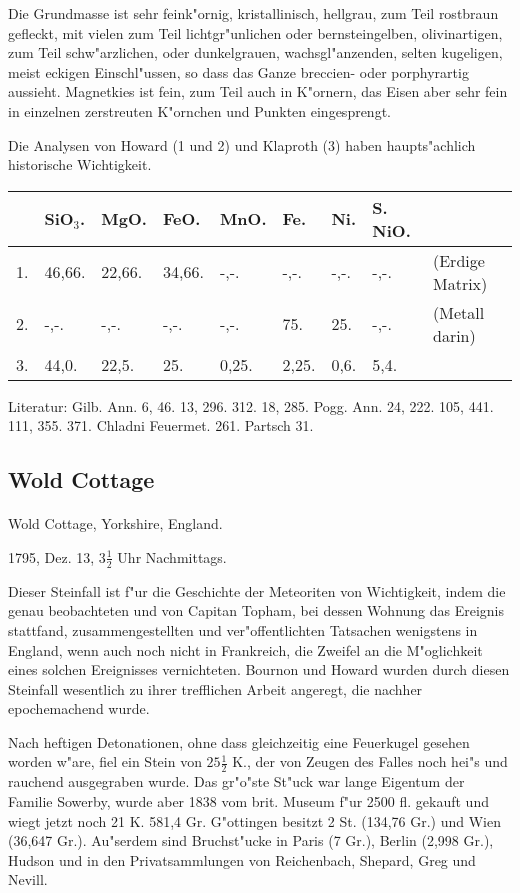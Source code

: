 \documentclass[a4paper, 11pt, oneside]{article}
\begin{document}
Die Grundmasse ist sehr feink"ornig, kristallinisch, hellgrau, zum Teil rostbraun gefleckt, mit vielen zum Teil lichtgr"unlichen oder bernsteingelben, olivinartigen, zum Teil schw"arzlichen, oder dunkelgrauen, wachsgl"anzenden, selten kugeligen, meist eckigen Einschl"ussen, so dass das Ganze breccien- oder porphyrartig aussieht. Magnetkies ist fein, zum Teil auch in K"ornern, das Eisen aber sehr fein in einzelnen zerstreuten K"ornchen und Punkten eingesprengt.

Die Analysen von Howard (1 und 2) und Klaproth (3) haben haupts"achlich historische Wichtigkeit.
\begin{table}[!ht]
    \centering
    \begin{tabular}{l l l l l l l l l}
         & SiO$_{3}$. & MgO. & FeO. & MnO. & Fe. & Ni. & S. NiO. &  \\ \hline
        1. & 46,66. & 22,66. & 34,66. & -,-. & -,-. & -,-. & -,-. & (Erdige Matrix) \\
        2. & -,-. & -,-. & -,-. & -,-. & 75. & 25. & -,-. & (Metall darin) \\
        3. & 44,0. & 22,5. & 25. & 0,25. & 2,25. & 0,6. & 5,4. &  \\
    \end{tabular}
\end{table}

\footnotesize
Literatur: Gilb. Ann. 6, 46. 13, 296. 312. 18, 285. Pogg. Ann. 24, 222. 105, 441. 111, 355. 371. Chladni Feuermet. 261. Partsch 31.
\subsection{Wold Cottage}
\normalsize
\paragraph{}
Wold Cottage, Yorkshire, England.

1795, Dez. 13, $3\frac{1}{2}$ Uhr Nachmittags.

Dieser Steinfall ist f"ur die Geschichte der Meteoriten von Wichtigkeit, indem die genau beobachteten und von Capitan Topham, bei dessen Wohnung das Ereignis stattfand, zusammengestellten und ver"offentlichten Tatsachen wenigstens in England, wenn auch noch nicht in Frankreich, die Zweifel an die M"oglichkeit eines solchen Ereignisses vernichteten. Bournon und Howard wurden durch diesen Steinfall wesentlich zu ihrer trefflichen Arbeit angeregt, die nachher epochemachend wurde.

Nach heftigen Detonationen, ohne dass gleichzeitig eine Feuerkugel gesehen worden w"are, fiel ein Stein von $25\frac{1}{2}$ K., der von Zeugen des Falles noch hei"s und rauchend ausgegraben wurde. Das gr"o"ste St"uck war lange Eigentum der Familie Sowerby, wurde aber 1838 vom brit. Museum f"ur 2500 fl. gekauft und wiegt jetzt noch 21 K. 581,4 Gr. G"ottingen besitzt 2 St. (134,76 Gr.) und Wien (36,647 Gr.). Au"serdem sind Bruchst"ucke in Paris (7 Gr.), Berlin (2,998 Gr.), Hudson und in den Privatsammlungen von Reichenbach, Shepard, Greg und Nevill.
\end{document}

